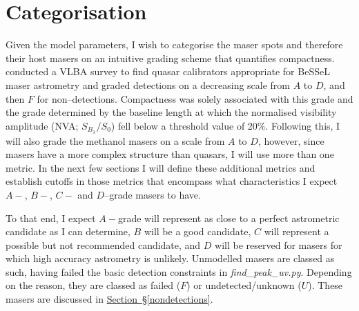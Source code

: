 	\clearpage
	\section{Categorisation} \label{sec:categorisation}
		Given the model parameters, I wish to categorise the maser spots and therefore their host masers on an intuitive grading scheme that quantifies compactness. \citet{Immer2011} conducted a VLBA survey to find quasar calibrators appropriate for BeSSeL maser astrometry and graded detections on a decreasing scale from $A$ to $D$, and then $F$ for non--detections. Compactness was solely associated with this grade and the grade determined by the baseline length at which the normalised visibility amplitude (NVA; $S_{B_\lambda}/S_0$) fell below a threshold value of 20\%. Following this, I will also grade the methanol masers on a scale from $A$ to $D$, however, since masers have a more complex structure than quasars, I will use more than one metric. In the next few sections I will define these additional metrics and establish cutoffs in those metrics that encompass what characteristics I expect $A-$, $B-$, $C-$ and $D$--grade masers to have.

		To that end, I expect $A-$grade will represent as close to a perfect astrometric candidate as I can determine, $B$ will be a good candidate, $C$ will represent a possible but not recommended candidate, and $D$ will be reserved for masers for which high accuracy astrometry is unlikely. Unmodelled masers are classed as such, having failed the basic detection constraints in {\it find\_peak\_uv.py}. Depending on the reason, they are classed as failed ($F$) or undetected/unknown 
		($U$). These masers are discussed in \hyperref[nondetections]{Section~\S\ref*{nondetections}}.
		

